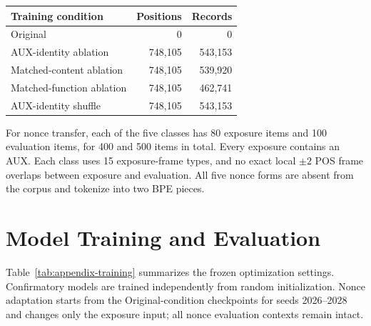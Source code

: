 \documentclass[11pt]{article}
\begin{document}
\begin{center}
  \small
  \setlength{\tabcolsep}{3.5pt}
  \begin{tabular}{@{}lrr@{}}
    \toprule
    Training condition & Positions & Records \\
    \midrule
    Original & 0 & 0 \\
    AUX-identity ablation & 748,105 & 543,153 \\
    Matched-content ablation & 748,105 & 539,920 \\
    Matched-function ablation & 748,105 & 462,741 \\
    AUX-identity shuffle & 748,105 & 543,153 \\
    \bottomrule
  \end{tabular}
  \label{tab:appendix-interventions}
\end{center}
\vspace{-0.35\baselineskip}

For nonce transfer, each of the five classes has 80 exposure items and 100 evaluation items, for 400 and 500 items in total. Every exposure contains an AUX. Each class uses 15 exposure-frame types, and no exact local $\pm2$ POS frame overlaps between exposure and evaluation. All five nonce forms are absent from the corpus and tokenize into two BPE pieces.

\section{Model Training and Evaluation}

Table~\ref{tab:appendix-training} summarizes the frozen optimization settings. Confirmatory models are trained independently from random initialization. Nonce adaptation starts from the Original-condition checkpoints for seeds 2026--2028 and changes only the exposure input; all nonce evaluation contexts remain intact.
\end{document}
